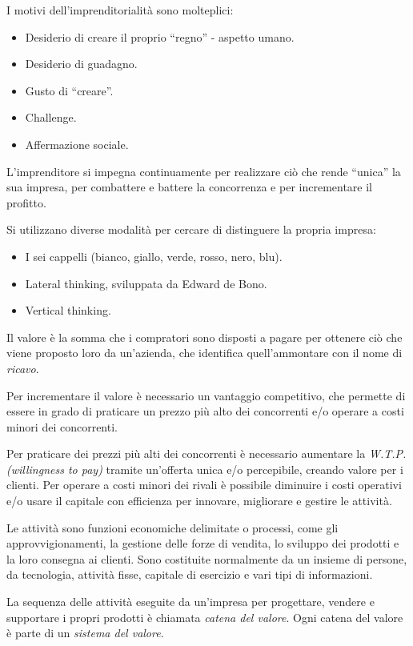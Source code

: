 I motivi dell’imprenditorialità sono molteplici:
\begin{itemize}
    \item Desiderio di creare il proprio ``regno'' - aspetto umano.
    \item Desiderio di guadagno.
    \item Gusto di ``creare''.
    \item Challenge.
    \item Affermazione sociale.
\end{itemize}

L’imprenditore si impegna continuamente per realizzare ciò che rende ``unica'' la sua impresa, per combattere e battere la concorrenza e per incrementare il profitto.

Si utilizzano diverse modalità per cercare di distinguere la propria impresa:
\begin{itemize}
    \item I sei cappelli (bianco, giallo, verde, rosso, nero, blu).
    \item Lateral thinking, sviluppata da Edward de Bono.
    \item Vertical thinking.
\end{itemize}

Il valore è la somma che i compratori sono disposti a pagare per ottenere ciò che viene proposto loro da un'azienda, che identifica quell’ammontare con il nome di \textit{ricavo}.

Per incrementare il valore è necessario un vantaggio competitivo, che permette di essere in grado di praticare un prezzo più alto dei concorrenti e/o operare a costi minori dei concorrenti.

Per praticare dei prezzi più alti dei concorrenti è necessario aumentare la \textit{W.T.P. (willingness to pay)} tramite un’offerta unica e/o percepibile, creando valore per i clienti. Per operare a costi minori dei rivali è possibile diminuire i costi operativi e/o usare il capitale con efficienza per innovare, migliorare e gestire le attività.

Le attività sono funzioni economiche delimitate o processi, come gli approvvigionamenti, la gestione delle forze di vendita, lo sviluppo dei prodotti e la loro consegna ai clienti. Sono costituite normalmente da un insieme di persone, da tecnologia, attività fisse, capitale di esercizio e vari tipi di informazioni.

La sequenza delle attività eseguite da un’impresa per progettare, vendere e supportare i propri prodotti è chiamata \textit{catena del valore}. Ogni catena del valore è parte di un \textit{sistema del valore}.
